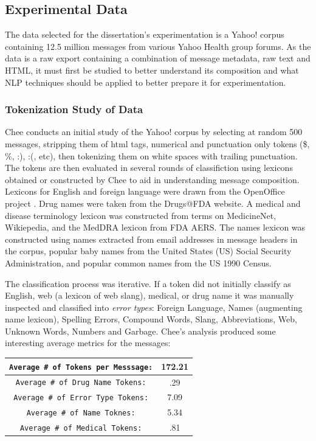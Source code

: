 \documentclass[twoside,11pt]{article}
\begin{document}
\subsection{Experimental Data}
The data selected for the dissertation's experimentation is a Yahoo! corpus containing 12.5 million messages from various Yahoo Health group forums. As the data is a raw export containing a combination of message metadata, raw text and HTML, it must first be studied to better understand its composition and what NLP techniques should be applied to better prepare it for experimentation.

\subsubsection{Tokenization Study of Data}
Chee conducts an initial study of the Yahoo! corpus by selecting at random 500 messages, stripping them of html tags, numerical and punctuation only tokens (\$, \%, :), :(, etc), then tokenizing them on white spaces with trailing punctuation. The tokens are then evaluated in several rounds of classifiction using lexicons obtained or constructed by Chee to aid in understanding message composition. Lexicons for English and foreign language were drawn from the OpenOffice project \citep{OpenOffice}. Drug names were taken from the Drugs@FDA website. A medical and disease terminology lexicon was constructed from terms on MedicineNet, Wikiepedia, and the MedDRA lexicon from FDA AERS. The names lexicon was constructed using names extracted from email addresses in message headers in the corpus, popular baby names from the United States (US) Social Security Administration, and popular common names from the US 1990 Census.

The classification process was iterative. If a token did not initially classify as English, web (a lexicon of web slang), medical, or drug name it was manually inspected and classified into \textit{error types}:  Foreign Language, Names (augmenting name lexicon), Spelling Errors, Compound Words, Slang, Abbreviations, Web, Unknown Words, Numbers and Garbage. Chee's analysis produced some interesting average metrics for the messages:

\begin{center}
  \begin{tabular}{|c|c|}
    \hline
    \verb|Average # of Tokens per Messsage:| & 172.21\\
    \hline
    \verb|Average # of Drug Name Tokens:| & .29\\
    \hline
    \verb|Average # of Error Type Tokens:| & 7.09\\
    \hline
    \verb|Average # of Name Toknes:| & 5.34\\
    \hline
    \verb|Average # of Medical Tokens:| & .81\\
    \hline
  \end{tabular}
\end{center}
\end{document}
